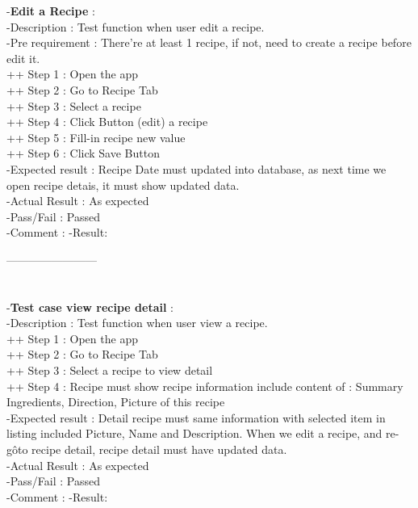 \documentclass{article}
\begin{document}
        -\textbf{Edit a Recipe }: \\
        -Description : Test function when user edit a recipe. \\
        -Pre requirement : There're at least 1 recipe, if not, need to create a recipe before edit it. \\
        ++ Step 1 : Open the app  \\
        ++ Step 2 : Go to Recipe Tab \\
        ++ Step 3 : Select a recipe  \\
        ++ Step 4 : Click Button (edit) a recipe \\
        ++ Step 5 : Fill-in recipe new value \\
        ++ Step 6 : Click Save Button \\
        -Expected result : Recipe Date must updated into database, as next time we open recipe detais, it must show updated data. \\
        -Actual Result : As expected \\
        -Pass/Fail : Passed \\
        -Comment : 
        -Result:
       
        ------------------------\\ \\ \\
        -\textbf{Test case view recipe detail }: \\
        -Description : Test function when user view a recipe. \\
        ++ Step 1 : Open the app  \\
        ++ Step 2 : Go to Recipe Tab \\
        ++ Step 3 : Select a recipe to view detail  \\
        ++ Step 4 : Recipe must show recipe information include content of : Summary Ingredients, Direction, Picture of this recipe\\
        -Expected result : Detail recipe must same information with selected item in listing included Picture, Name and Description. When we edit a recipe, and re-gôto recipe detail, recipe detail must have updated data. \\
        -Actual Result : As expected \\
        -Pass/Fail : Passed \\
        -Comment : 
        -Result:
       
\end{document}
